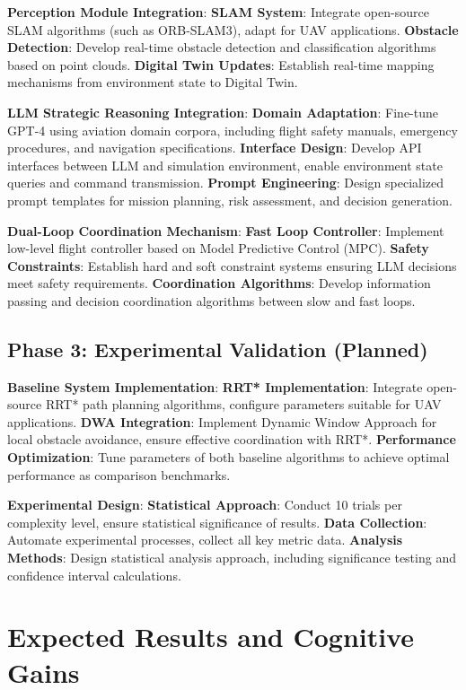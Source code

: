 {\textbf{Perception Module Integration}:
\textbf{SLAM System}: Integrate open-source SLAM algorithms (such as ORB-SLAM3), adapt for UAV applications.
\textbf{Obstacle Detection}: Develop real-time obstacle detection and classification algorithms based on point clouds.
\textbf{Digital Twin Updates}: Establish real-time mapping mechanisms from environment state to Digital Twin.

\textbf{LLM Strategic Reasoning Integration}:
\textbf{Domain Adaptation}: Fine-tune GPT-4 using aviation domain corpora, including flight safety manuals, emergency procedures, and navigation specifications.
\textbf{Interface Design}: Develop API interfaces between LLM and simulation environment, enable environment state queries and command transmission.
\textbf{Prompt Engineering}: Design specialized prompt templates for mission planning, risk assessment, and decision generation.

\textbf{Dual-Loop Coordination Mechanism}:
\textbf{Fast Loop Controller}: Implement low-level flight controller based on Model Predictive Control (MPC).
\textbf{Safety Constraints}: Establish hard and soft constraint systems ensuring LLM decisions meet safety requirements.
\textbf{Coordination Algorithms}: Develop information passing and decision coordination algorithms between slow and fast loops.

\subsection{Phase 3: Experimental Validation (Planned)}

\textbf{Baseline System Implementation}:
\textbf{RRT* Implementation}: Integrate open-source RRT* path planning algorithms, configure parameters suitable for UAV applications.
\textbf{DWA Integration}: Implement Dynamic Window Approach for local obstacle avoidance, ensure effective coordination with RRT*.
\textbf{Performance Optimization}: Tune parameters of both baseline algorithms to achieve optimal performance as comparison benchmarks.

\textbf{Experimental Design}:
\textbf{Statistical Approach}: Conduct 10 trials per complexity level, ensure statistical significance of results.
\textbf{Data Collection}: Automate experimental processes, collect all key metric data.
\textbf{Analysis Methods}: Design statistical analysis approach, including significance testing and confidence interval calculations.

\section{Expected Results and Cognitive Gains}

}
